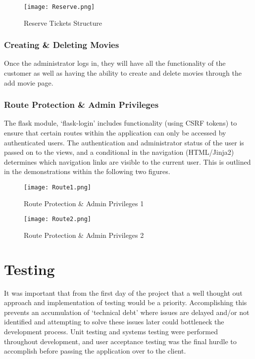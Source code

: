 \documentclass[11pt, english]{article}
\begin{document}
	\begin{figure}[H]
	\begin{center}
		\texttt{[image: Reserve.png]}
		\caption{Reserve Tickets Structure}
	\end{center}
	\end{figure}

		\subsubsection{Creating \& Deleting Movies}

	Once the administrator logs in, they will have all the functionality of the customer as well as having the ability to create and delete movies through the add movie page.

		\subsubsection{Route Protection \& Admin Privileges}

	The flask module, `flask-login' includes functionality (using CSRF tokens) to ensure that certain routes within the application can only be accessed by authenticated users. The authentication and administrator status of the user is passed on to the views, and a conditional in the navigation (HTML/Jinja2) determines which navigation links are visible to the current user. This is outlined in the demonstrations within the following two figures.

	\begin{figure}[H]
	\begin{center}
		\texttt{[image: Route1.png]}
		\caption{Route Protection \& Admin Privileges 1}
	\end{center}
	\end{figure}

	\begin{figure}[H]
	\begin{center}
		\texttt{[image: Route2.png]}
		\caption{Route Protection \& Admin Privileges 2}
	\end{center}
	\end{figure}

\newpage

\section{Testing}

	It was important that from the first day of the project that a well thought out approach and implementation of testing would be a priority. Accomplishing this prevents an accumulation of `technical debt' where issues are delayed and/or not identified and attempting to solve these issues later could bottleneck the development process. Unit testing and systems testing were performed throughout development, and user acceptance testing was the final hurdle to accomplish before passing the application over to the client.
\end{document}
